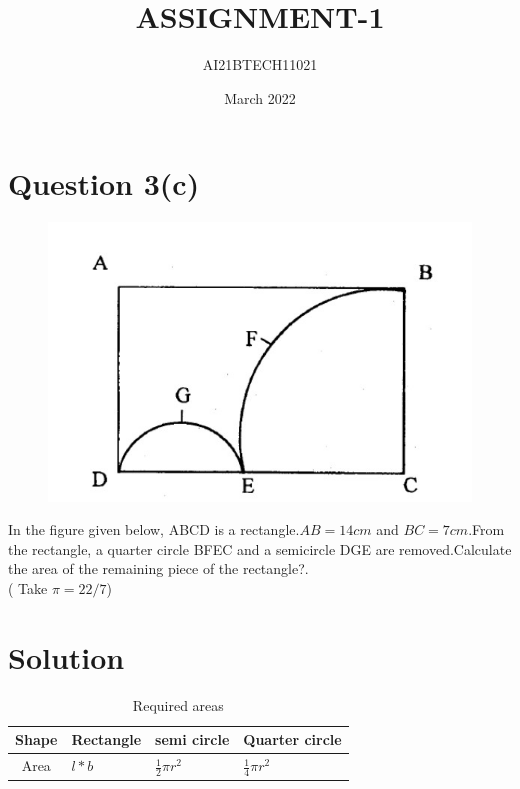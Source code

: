 \documentclass[journal,11pt,a4paper]{article}
\begin{document}
\title{ASSIGNMENT-1}
\author{AI21BTECH11021}
\date{March 2022}
\maketitle
\begin{multicols}{2}
\section*{\large Question 3(c)}
\begin{figure}[H]
    \centering
    \includegraphics[scale = 0.5]{Figure_1.jpg}
\end{figure}

In the figure given below, ABCD is a rectangle.${AB = 14cm}$ and
${BC= 7 cm}$.From the rectangle, a quarter circle BFEC and a
semicircle DGE are removed.Calculate the area of the remaining
piece of the rectangle?.\\
( Take $ \pi = 22/7 $)\\
\hline
\section*{\Large{Solution\:}}

\begin{table}[H]
    \centering
    \renewcommand{\arraystretch}{1.5}
    \begin{tabular}{|c|p{1.5cm}|p{1.2cm}|p{1.2cm}|}
    \hline
    Shape & Rectangle & semi circle & Quarter circle\\ \hline
    Area &$l*b$ & $\frac{1}{2}\pi r^2$ & $\frac{1}{4}\pi r^2$\\
    \hline
    \end{tabular}
    \caption{Required areas}
\end{table}


\end{multicols}
\end{document}
